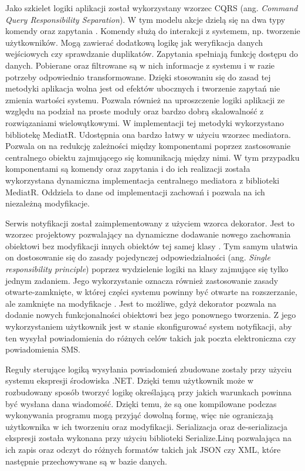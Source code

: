 Jako szkielet logiki aplikacji został wykorzystany wzorzec CQRS 
(ang. \textit{Command Query Responsibility Separation}).
W tym modelu akcje dzielą się na dwa typy komendy oraz zapytania \cite{fowler:cqrs}.
Komendy służą do interakcji z systemem, np. tworzenie użytkowników.
Mogą zawierać dodatkową logikę jak weryfikacja danych wejściowych 
czy sprawdzanie duplikatów.
Zapytania spełniają funkcję dostępu do danych. Pobierane oraz
filtrowane są w nich informacje z systemu i w razie potrzeby
odpowiednio transformowane.
Dzięki stosowaniu się do zasad tej metodyki aplikacja wolna
jest od efektów ubocznych i tworzenie zapytań nie zmienia
wartości systemu. Pozwala również na uproszczenie logiki
aplikacji ze względu na podział na proste moduły oraz bardzo
dobrą skalowalność z rozwiązaniami wielowątkowymi.
W implementacji tej metodyki wykorzystano bibliotekę MediatR.
Udostępnia ona bardzo łatwy w użyciu wzorzec mediatora.
Pozwala on na redukcję zależności między komponentami poprzez
zastosowanie centralnego obiektu zajmującego się komunikacją między nimi\cite{freeman2004head}.
W tym przypadku komponentami są komendy oraz zapytania i do ich realizacji
została wykorzystana dynamiczna implementacja centralnego
mediatora z biblioteki MediatR. Oddziela to dane od implementacji
zachowań i pozwala na ich niezależną modyfikacje.

Serwis notyfikacji został zaimplementowany z użyciem wzorca dekorator.
Jest to wzorzec projektowy pozwalający na dynamiczne dodawanie nowego
zachowania obiektowi bez modyfikacji innych obiektów tej samej klasy
\cite{freeman2004head}. Tym samym ułatwia on dostosowanie się do zasady
pojedynczej odpowiedzialności (ang. \textit{Single responsibility principle})
poprzez wydzielenie logiki na klasy zajmujące się tylko jednym zadaniem.
Jego wykorzystanie oznacza również zastosowanie zasady otwarte-zamknięte, w
której części systemu powinny być otwarte na rozszerzanie, ale zamknięte
na modyfikacje \cite{meyer1988object}. Jest to możliwe, gdyż dekorator pozwala
na dodanie nowych funkcjonalności obiektowi bez jego ponownego tworzenia.
Z jego wykorzystaniem użytkownik jest w stanie skonfigurować system notyfikacji,
aby ten wysyłał powiadomienia do różnych celów takich jak poczta elektroniczna
czy powiadomienia SMS.

Reguły sterujące logiką wysyłania powiadomień zbudowane zostały przy użyciu systemu
ekspresji środowiska .NET. Dzięki temu użytkownik może w rozbudowany sposób
tworzyć logikę określającą przy jakich warunkach powinna być wysłana dana wiadomość.
Dzięki temu, że są one kompilowane podczas wykonywania programu mogą przyjąć dowolną
formę, więc nie ograniczają użytkownika w ich tworzeniu oraz modyfikacji.
Serializacja oraz de-serializacja ekspresji została wykonana przy użyciu biblioteki
Serialize.Linq pozwalająca na ich zapis oraz odczyt do różnych formatów takich jak
JSON czy XML, które następnie przechowywane są w bazie danych.

